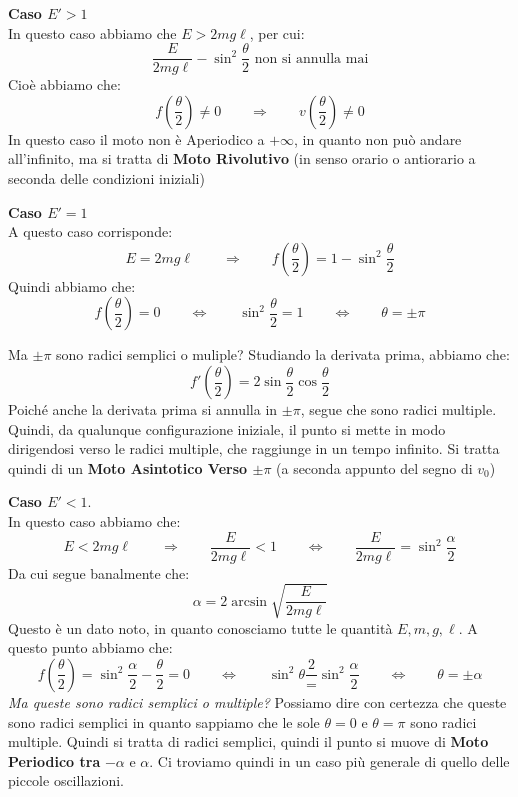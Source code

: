 \documentclass[11pt,a4paper,twoside]{article}
\theoremstyle{definition}
\begin{document}
\textbf{Caso $E'>1$}\\
In questo caso abbiamo che $E>2mg\ell$, per cui:
\[ \frac E{2mg\ell} - \sin^2 \frac \theta 2\text{ non si annulla mai}\]
Cioè abbiamo che:
\[ f\left(\frac \theta 2\right) \neq 0 \qquad \Rightarrow \qquad v\left(\frac \theta 2\right) \neq 0\]
In questo caso il moto non è Aperiodico a $+\infty$, in quanto non può andare all'infinito, ma si tratta di \textbf{Moto Rivolutivo} (in senso orario o antiorario a seconda delle condizioni iniziali)

\textbf{Caso $E'=1$}\\
A questo caso corrisponde:
\[ E=2mg\ell \qquad \Rightarrow \qquad f\left(\frac {\theta}{2} \right) = 1-\sin^2\frac \theta 2 \]
Quindi abbiamo che:
\[ f\left(\frac \theta 2\right) =0 \qquad \Leftrightarrow \qquad \sin^2\frac \theta 2 = 1 \qquad \Leftrightarrow \qquad \theta = \pm \pi\]
\begin{center}
\end{center}
Ma $\pm \pi$ sono radici semplici o muliple? Studiando la derivata prima, abbiamo che:
\[ f'\left(\frac \theta 2\right) = 2 \sin \frac \theta 2 \cos  \frac \theta 2 \]
Poiché anche la derivata prima si annulla in $\pm \pi$, segue che sono radici multiple. Quindi, da qualunque configurazione iniziale, il punto si mette in modo dirigendosi verso le radici multiple, che raggiunge in un tempo infinito. Si tratta quindi di un \textbf{Moto Asintotico Verso $\pm \pi$} (a seconda appunto del segno di $v_0$)

\textbf{Caso $E'<1$}.\\
In questo caso abbiamo che:
\[ E<2mg\ell \qquad \Rightarrow \qquad \frac E{2mg \ell}<1 \qquad \Leftrightarrow \qquad \frac{E}{2mg\ell} = \sin^2\frac \alpha 2 \]
Da cui segue banalmente che:
\[ \alpha = 2 \arcsin \sqrt{\frac E{2mg\ell}} \]
Questo è un dato noto, in quanto conosciamo tutte le quantità $E,m,g,\ell$. A questo punto abbiamo che:
\[ f\left( \frac \theta 2 \right) = \sin^2\frac \alpha 2 - \frac \theta 2 = 0 \qquad \Leftrightarrow \qquad \sin^2 \theta \frac 2 = \sin^2 \frac \alpha 2 \qquad \Leftrightarrow \qquad \theta = \pm \alpha \]
\textit{Ma queste sono radici semplici o multiple?} Possiamo dire con certezza che queste sono radici semplici in quanto sappiamo che le sole $\theta = 0$ e $\theta = \pi$ sono radici multiple. Quindi si tratta di radici semplici, quindi il punto si muove di \textbf{Moto Periodico tra} $-\alpha$ e $\alpha$. Ci troviamo quindi in un caso più generale di quello delle piccole oscillazioni.
\end{document}
